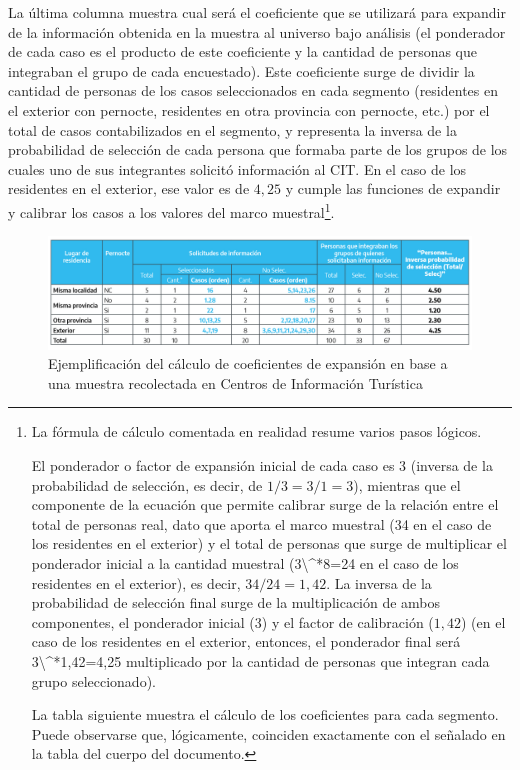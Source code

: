 \documentclass[
]{book}
\begin{document}
La última columna muestra cual será el coeficiente que se utilizará para expandir de la información obtenida en la muestra al universo bajo análisis (el ponderador de cada caso es el producto de este coeficiente y la cantidad de personas que integraban el grupo de cada encuestado). Este coeficiente surge de dividir la cantidad de personas de los casos seleccionados en cada segmento (residentes en el exterior con pernocte, residentes en otra provincia con pernocte, etc.) por el total de casos contabilizados en el segmento, y representa la inversa de la probabilidad de selección de cada persona que formaba parte de los grupos de los cuales uno de sus integrantes solicitó información al CIT. En el caso de los residentes en el exterior, ese valor es de \(4,25\) y cumple las funciones de expandir y calibrar los casos a los valores del marco muestral\footnote{La fórmula de cálculo comentada en realidad resume varios pasos lógicos.

  El ponderador o factor de expansión inicial de cada caso es 3 (inversa de la probabilidad de selección, es decir, de \(1/3=3/1=3\)), mientras que el componente de la ecuación que permite calibrar surge de la relación entre el total de personas real, dato que aporta el marco muestral (34 en el caso de los residentes en el exterior) y el total de personas que surge de multiplicar el ponderador inicial a la cantidad muestral (3\textbackslash\^{}*8=24 en el caso de los residentes en el exterior), es decir, \(34/24=1,42\). La inversa de la probabilidad de selección final surge de la multiplicación de ambos componentes, el ponderador inicial (\(3\)) y el factor de calibración (\(1,42\)) (en el caso de los residentes en el exterior, entonces, el ponderador final será 3\textbackslash\^{}*1,42=4,25 multiplicado por la cantidad de personas que integran cada grupo seleccionado).

  La tabla siguiente muestra el cálculo de los coeficientes para cada segmento. Puede observarse que, lógicamente, coinciden exactamente con el señalado en la tabla del cuerpo del documento.}.

\begin{figure}

{\centering \includegraphics[width=1\linewidth]{imagenes/tabla_1} 

}

\caption{Ejemplificación del cálculo de coeficientes de expansión en base a una muestra recolectada en Centros de Información Turística}\label{fig:Coeficientes}
\end{figure}
\end{document}
